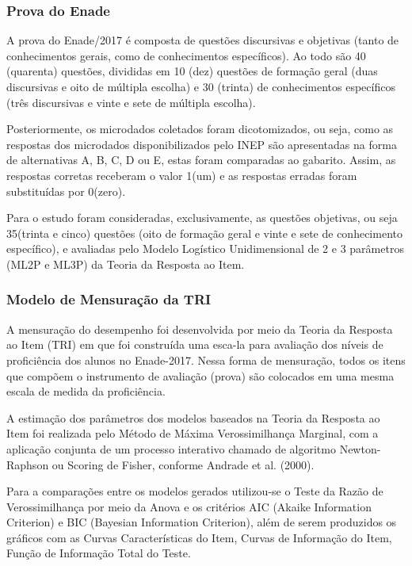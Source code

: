 \documentclass[12pt]{article}
\begin{document}
\subsubsection{Prova do Enade}
\label{sec:MET}

A prova do Enade/2017 é composta de questões discursivas e objetivas (tanto de conhecimentos gerais, como de conhecimentos específicos). Ao todo são 40 (quarenta) questões, divididas em 10 (dez) questões de formação geral (duas discursivas e oito de múltipla escolha) e 30 (trinta) de conhecimentos específicos (três discursivas e vinte e sete de múltipla escolha).\vskip0.3cm

Posteriormente, os microdados coletados foram dicotomizados, ou seja, como as respostas dos microdados disponibilizados pelo INEP são apresentadas na forma de alternativas A, B, C, D ou E, estas foram comparadas ao gabarito. Assim, as respostas corretas receberam o valor 1(um) e as respostas erradas foram substituídas por 0(zero). 

Para o estudo foram consideradas, exclusivamente, as questões objetivas, ou seja 35(trinta e cinco) questões (oito de formação geral e vinte e sete de conhecimento específico), e avaliadas pelo Modelo Logístico Unidimensional de 2 e 3 parâmetros (ML2P e ML3P) da Teoria da Resposta ao Item.


\subsubsection{Modelo de Mensuração da TRI}

A mensuração do desempenho foi desenvolvida por meio da Teoria da Resposta ao Item (TRI) em que foi construída uma esca-la para avaliação dos níveis de proficiência dos alunos no Enade-2017. Nessa forma de mensuração, todos os itens que compõem o instrumento de avaliação (prova) são colocados em uma mesma escala de medida da proficiência.

A estimação dos parâmetros dos modelos baseados na Teoria da Resposta ao Item foi realizada pelo Método de Máxima Verossimilhança Marginal, com a aplicação conjunta de um processo interativo chamado de algoritmo Newton-Raphson ou Scoring de Fisher, conforme Andrade et al. (2000).\vskip0.3cm

Para a comparações entre os modelos gerados utilizou-se o Teste da Razão de Verossimilhança por meio da Anova e os critérios AIC (Akaike Information Criterion) e BIC (Bayesian Information Criterion), além de serem produzidos os gráficos com as Curvas Características do Item, Curvas de Informação do Item, Função de Informação Total do Teste.\vskip0.3cm
\end{document}
